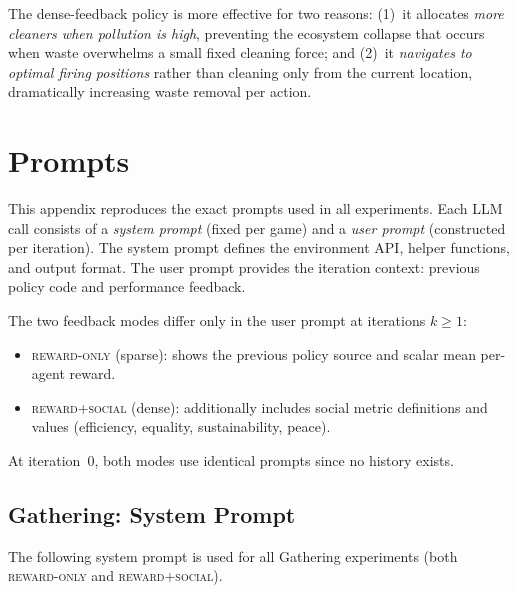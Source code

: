 \documentclass{nextgame2026} %
\begin{document}
The dense-feedback policy is more effective for two reasons:
(1)~it allocates \emph{more cleaners when pollution is high}, preventing
the ecosystem collapse that occurs when waste overwhelms a small fixed
cleaning force; and (2)~it \emph{navigates to optimal firing positions}
rather than cleaning only from the current location, dramatically
increasing waste removal per action.

\section{Prompts}
\label{app:prompts}

This appendix reproduces the exact prompts used in all experiments.
Each LLM call consists of a \emph{system prompt} (fixed per game) and a
\emph{user prompt} (constructed per iteration).  The system prompt
defines the environment API, helper functions, and output format.  The
user prompt provides the iteration context: previous policy code and
performance feedback.

The two feedback modes differ only in the user prompt at iterations
$k \geq 1$:
\begin{itemize}
\item \textsc{reward-only} (sparse): shows the previous policy source
      and scalar mean per-agent reward.
\item \textsc{reward+social} (dense): additionally includes social
      metric definitions and values (efficiency, equality,
      sustainability, peace).
\end{itemize}
At iteration~0, both modes use identical prompts since no history
exists.


\subsection{Gathering: System Prompt}
\label{app:prompt-gathering-sys}

The following system prompt is used for all Gathering experiments
(both \textsc{reward-only} and \textsc{reward+social}).
\end{document}
